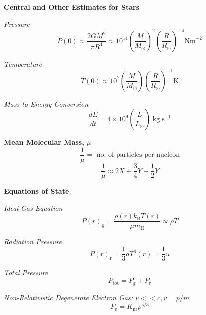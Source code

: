 \documentclass{spy}
\begin{document}
\textbf {Central and Other Estimates for Stars}

\textit{Pressure}
\begin{equation}
P(0) \approx \frac{2 G M^2}{\pi R^4} \approx 10^{14} \left( \frac{M}{M_\odot} \right)^2  \left( \frac{R}{R_\odot} \right)^{-4} \mathrm{N m}^{-2}
\end{equation}

\textit{Temperature}
\begin{equation}
T(0) \approx 10^7 \left( \frac{M}{M_\odot} \right)  \left( \frac{R}{R_\odot} \right)^{-1} \mathrm{K}
\end{equation}

\textit{Mass to Energy Conversion}
\begin{equation}
\frac{dE}{dt} =  4 \times 10^{9}  \left( \frac{L}{L_\odot} \right) \; \mathrm{kg \; s}^{-1}
\end{equation}



\textbf{Mean Molecular Mass, \(\mu\)}
\begin{equation}
\frac{1}{\mu} = \text{ no. of particles per nucleon}
\end{equation}
\begin{equation}
\frac{1}{\mu} \approx 2X + \frac{3}{4}Y +  \frac{1}{2}Y
\end{equation}
\begin{center}
\end{center}



\textbf {Equations of State}


\textit {Ideal Gas Equation}
\begin{equation}
P(r)_\mathrm{g} = \frac {\rho(r) k_\mathrm{B} T(r)}{\mu m_\mathrm{H}} \propto \rho T
\end{equation}

\textit {Radiation Pressure}
\begin{equation}
P(r)_\mathrm{r} = \frac {1}{3} a T^4(r) = \frac {1}{3} u
\end{equation}

\textit{Total Pressure}
\begin{equation}
P_\mathrm{tot} = P_\mathrm{g} + P_\mathrm{r}
\end{equation}

\textit {Non-Relativistic Degenerate Electron Gas: \(v<<c, v = p/m\)}
\begin{equation}
P_\mathrm{e} = K_\mathrm{nr} \rho^{5/3}
\end{equation}
\end{document}
